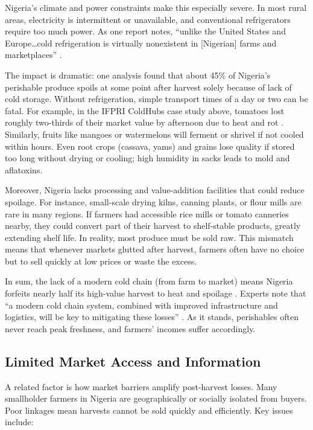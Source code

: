 {Nigeria’s climate and power constraints make this especially severe. In most rural areas, electricity is intermittent or unavailable, and conventional refrigerators require too much power. As one report notes, “unlike the United States and Europe…cold refrigeration is virtually nonexistent in [Nigerian] farms and marketplaces” \citep{Ikegwuonu2018}.
\vspace{\myvspace}

The impact is dramatic: one analysis found that about 45\% of Nigeria’s perishable produce spoils at some point after harvest solely because of lack of cold storage\citep{Ikegwuonu2018}. Without refrigeration, simple transport times of a day or two can be fatal. For example, in the IFPRI ColdHubs case study above, tomatoes lost roughly two-thirds of their market value by afternoon due to heat and rot \citep{Ikegwuonu2018}. Similarly, fruits like mangoes or watermelons will ferment or shrivel if not cooled within hours. Even root crops (cassava, yams) and grains lose quality if stored too long without drying or cooling; high humidity in sacks leads to mold and aflatoxins.
\vspace{\myvspace}

Moreover, Nigeria lacks processing and value-addition facilities that could reduce spoilage. For instance, small-scale drying kilns, canning plants, or flour mills are rare in many regions. If farmers had accessible rice mills or tomato canneries nearby, they could convert part of their harvest to shelf-stable products, greatly extending shelf life. In reality, most produce must be sold raw. This mismatch means that whenever markets glutted after harvest, farmers often have no choice but to sell quickly at low prices or waste the excess.
\vspace{\myvspace}

In sum, the lack of a modern cold chain (from farm to market) means Nigeria forfeits nearly half its high-value harvest to heat and spoilage
\citep{Ikegwuonu2018, OTACCWA2025}. Experts note that “a modern cold chain system, combined with improved infrastructure and logistics, will be key to mitigating these losses” \citep{Ikegwuonu2018, OTACCWA2025}. As it stands, perishables often never reach peak freshness, and farmers’ incomes suffer accordingly.

\subsection{Limited Market Access and Information}
A related factor is how market barriers amplify post-harvest losses. Many smallholder farmers in Nigeria are geographically or socially isolated from buyers. Poor linkages mean harvests cannot be sold quickly and efficiently. Key issues include:

}
